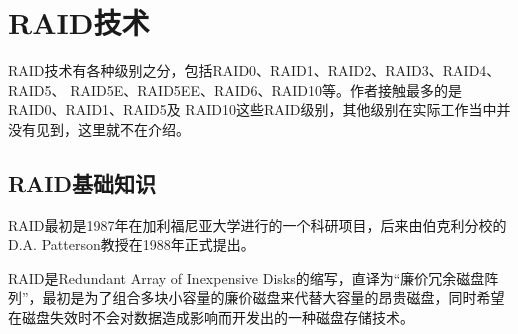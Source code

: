 



\chapter{RAID技术}

RAID技术有各种级别之分，包括RAID0、RAID1、RAID2、RAID3、RAID4、RAID5、
RAID5E、RAID5EE、RAID6、RAID10等。作者接触最多的是RAID0、RAID1、RAID5及
RAID10这些RAID级别，其他级别在实际工作当中并没有见到，这里就不在介绍。

\section{RAID基础知识}

RAID最初是1987年在加利福尼亚大学进行的一个科研项目，后来由伯克利分校的
D.A. Patterson教授在1988年正式提出。

RAID是Redundant Array of Inexpensive Disks的缩写，直译为“廉价冗余磁盘阵
列”，最初是为了组合多块小容量的廉价磁盘来代替大容量的昂贵磁盘，同时希望
在磁盘失效时不会对数据造成影响而开发出的一种磁盘存储技术。

